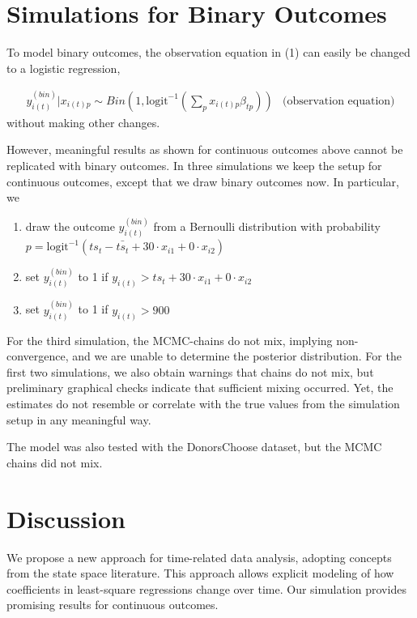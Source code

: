 \documentclass{article}
\begin{document}
\section{Simulations for Binary Outcomes}\label{sec:binary}

To model binary outcomes, the observation equation in (1) can easily be changed to a logistic regression,

\begin{eqnarray}
y^{(bin)}_{i(t)} | x_{i(t)p} \sim Bin(1, \textrm{logit}^{-1}(\sum_p x_{i(t)p} \beta_{tp})) & \textrm{(observation equation)}
\end{eqnarray}
without making other changes.

However, meaningful results as shown for continuous outcomes above cannot be replicated with binary outcomes. In three simulations we keep the setup for continuous outcomes, except that we draw binary outcomes now. In particular, we 

\begin{enumerate}
    \item draw the outcome $y^{(bin)}_{i(t)}$ from a Bernoulli distribution with probability $p = \textrm{logit}^{-1}(ts_t - \bar{ts_t} + 30 \cdot x_{i1} + 0 \cdot x_{i2})$
    \item set $y^{(bin)}_{i(t)}$ to 1 if $y_{i(t)} > ts_t + 30 \cdot x_{i1} + 0 \cdot x_{i2}$
    \item set $y^{(bin)}_{i(t)}$ to 1 if $y_{i(t)} > 900$
\end{enumerate}

For the third simulation, the MCMC-chains do not mix, implying non-convergence, and we are unable to determine the posterior distribution. For the first two simulations, we also obtain warnings that chains do not mix, but preliminary graphical checks indicate that sufficient mixing occurred. Yet, the estimates do not resemble or correlate with the true values from the simulation setup in any meaningful way.

The model was also tested with the DonorsChoose dataset, but the MCMC chains did not mix.

\section{Discussion}\label{sec:discussion}

We propose a new approach for time-related data analysis, adopting concepts from the state space literature. This approach allows explicit modeling of how coefficients in least-square regressions change over time. Our simulation provides promising results for continuous outcomes.
\end{document}
